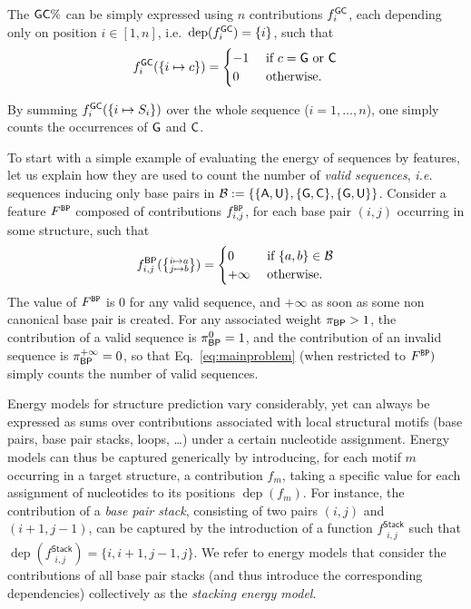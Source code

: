 \documentclass[]{bmcart}
\newcommand{\dep}{\operatorname{dep}}
\newcommand{\Def}[1]{\emph{#1}}
\newcommand{\Nuc}[1]{{\sf #1}}
\newcommand{\Ab}{\Nuc{A}}
\newcommand{\Cb}{\Nuc{C}}
\newcommand{\Gb}{\Nuc{G}}
\newcommand{\Ub}{\Nuc{U}}
\newcommand{\GCb}{\Gb\Cb}
\newcommand{\revised}[1]{{\color{red} #1}}
\begin{document}
The $\GCb\%$ can be simply expressed using $n$ contributions $f^{\GCb}_i$, \revised{each depending only on position $i\in[1,n]$, i.e.~$\dep(f^{\GCb}_i)=\{i\}$}, such that 
$$f^{\GCb}_i(\{i\mapsto c\})=\begin{cases}-1&\text{ if }c=\Gb\text{ or }\Cb\\ 0&\text{ otherwise}.\end{cases}$$ 

\revised{By summing $f^{\GCb}_i(\{i\mapsto S_i\})$ over the whole sequence ($i=1,\dots,n$), one simply counts the occurrences of $\Gb$ and $\Cb$.}

\revised{
  To start with a simple example of evaluating the energy of sequences by features, let us explain how they are used to count the number of \Def{valid sequences}, \emph{i.e.} sequences inducing only base pairs in $\mathcal{B}:=\{\{\Ab,\Ub\}, \{\Gb,\Cb\}, \{\Gb,\Ub\}\}$. Consider a feature $F^{\tt BP}$ composed of  contributions $f^{\tt BP}_{i,j}$, for each base pair $(i,j)$ occurring in some structure, such that 
	$$f^{{\sf BP}}_{i,j}(\left\{\substack{i\mapsto a\\j\mapsto b}\right\})=\begin{cases}0&\text{ if }\{a,b\}\in\mathcal{B} \\+\infty&\text{ otherwise}.\end{cases}$$ 
        The value of $F^{\tt BP}$ is $0$ for any valid sequence, and $+\infty$ as soon as some non canonical base pair is created. For any associated weight $\pi_{{\sf BP}}>1$, the contribution of a valid sequence is $\pi_{{\sf BP}}^0 = 1$, and the contribution of an invalid sequence is $\pi_{{\sf BP}}^{+\infty} = 0$, so that Eq.~\ref{eq:mainproblem} (when restricted to $F^{\tt BP})$ simply counts the number of valid sequences.


        Energy models for structure prediction vary considerably, yet can always be expressed as sums over contributions associated with local structural motifs (base pairs, base pair stacks, loops, \ldots) under a certain nucleotide assignment. Energy models can thus be captured generically by introducing, for each motif $m$ occurring in a target structure, a contribution $f_m$, taking a specific value for each assignment of nucleotides to its positions $\dep(f_m)$. For instance, the contribution of a \Def{base pair stack}, consisting of two pairs $(i,j)$ and $(i+1,j-1)$, can be captured by the introduction of a function $f^{\textsf{Stack}}_{\substack{i,j}}$ such that $\dep(f^{\textsf{Stack}}_{\substack{i,j}}) = \{i,i+1,j-1,j\}$.
        We refer to energy models that consider the contributions of all base pair stacks (and thus introduce the corresponding dependencies) collectively as the \Def{stacking energy model}.
}
\end{document}
